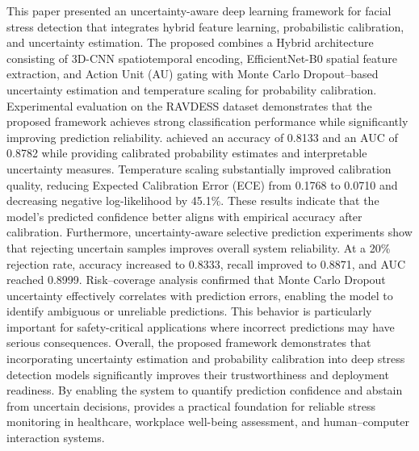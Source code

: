 \documentclass[conference]{IEEEtran}
\begin{document}
This paper presented an uncertainty-aware deep learning framework for facial stress detection that integrates hybrid feature learning, probabilistic calibration, and uncertainty estimation. The proposed  combines a Hybrid architecture consisting of 3D-CNN spatiotemporal encoding, EfficientNet-B0 spatial feature extraction, and Action Unit (AU) gating with Monte Carlo Dropout–based uncertainty estimation and temperature scaling for probability calibration.
Experimental evaluation on the RAVDESS dataset demonstrates that the proposed framework achieves strong classification performance while significantly improving prediction reliability.  achieved an accuracy of 0.8133 and an AUC of 0.8782 while providing calibrated probability estimates and interpretable uncertainty measures. Temperature scaling substantially improved calibration quality, reducing Expected Calibration Error (ECE) from 0.1768 to 0.0710 and decreasing negative log-likelihood by 45.1\%. These results indicate that the model’s predicted confidence better aligns with empirical accuracy after calibration.
Furthermore, uncertainty-aware selective prediction experiments show that rejecting uncertain samples improves overall system reliability. At a 20\% rejection rate, accuracy increased to 0.8333, recall improved to 0.8871, and AUC reached 0.8999. Risk–coverage analysis confirmed that Monte Carlo Dropout uncertainty effectively correlates with prediction errors, enabling the model to identify ambiguous or unreliable predictions. This behavior is particularly important for safety-critical applications where incorrect predictions may have serious consequences.
Overall, the proposed framework demonstrates that incorporating uncertainty estimation and probability calibration into deep stress detection models significantly improves their trustworthiness and deployment readiness. By enabling the system to quantify prediction confidence and abstain from uncertain decisions,  provides a practical foundation for reliable stress monitoring in healthcare, workplace well-being assessment, and human–computer interaction systems.
\end{document}
